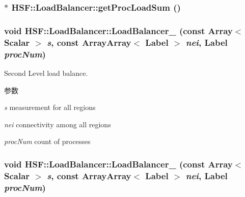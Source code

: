 \label{classHSF_1_1LoadBalancer_ad25ef85b3641df45c4f62a5dccf15454}
\hypertarget{classHSF_1_1LoadBalancer_ad25ef85b3641df45c4f62a5dccf15454}{
\subsubsection[{getProcLoadSum}]{$\ast$ HSF::LoadBalancer::getProcLoadSum ()}}
\label{classHSF_1_1LoadBalancer_ad25ef85b3641df45c4f62a5dccf15454}
\hypertarget{classHSF_1_1LoadBalancer_a06147f535aa0c290b332c9578d80d3fa}{
\subsubsection[{LoadBalancer\_\-2}]{\setlength{\rightskip}{0pt plus 5cm}void HSF::LoadBalancer::LoadBalancer\_ (const Array$<$ {\bf Scalar} $>$ {\em s}, \/  const {\bf ArrayArray}$<$ {\bf Label} $>$ {\em nei}, \/  {\bf Label} {\em procNum})}}
\label{classHSF_1_1LoadBalancer_a06147f535aa0c290b332c9578d80d3fa}


Second Level load balance. 
\begin{DoxyParams}{参数}
\item[{\em s}]measurement for all regions \item[{\em nei}]connectivity among all regions \item[{\em procNum}]count of processes \end{DoxyParams}
\hypertarget{classHSF_1_1LoadBalancer_a06147f535aa0c290b332c9578d80d3fa}{
\subsubsection[{LoadBalancer\_\-2}]{\setlength{\rightskip}{0pt plus 5cm}void HSF::LoadBalancer::LoadBalancer\_ (const Array$<$ {\bf Scalar} $>$ {\em s}, \/  const {\bf ArrayArray}$<$ {\bf Label} $>$ {\em nei}, \/  {\bf Label} {\em procNum})}}
\label{classHSF_1_1LoadBalancer_a06147f535aa0c290b332c9578d80d3fa}


